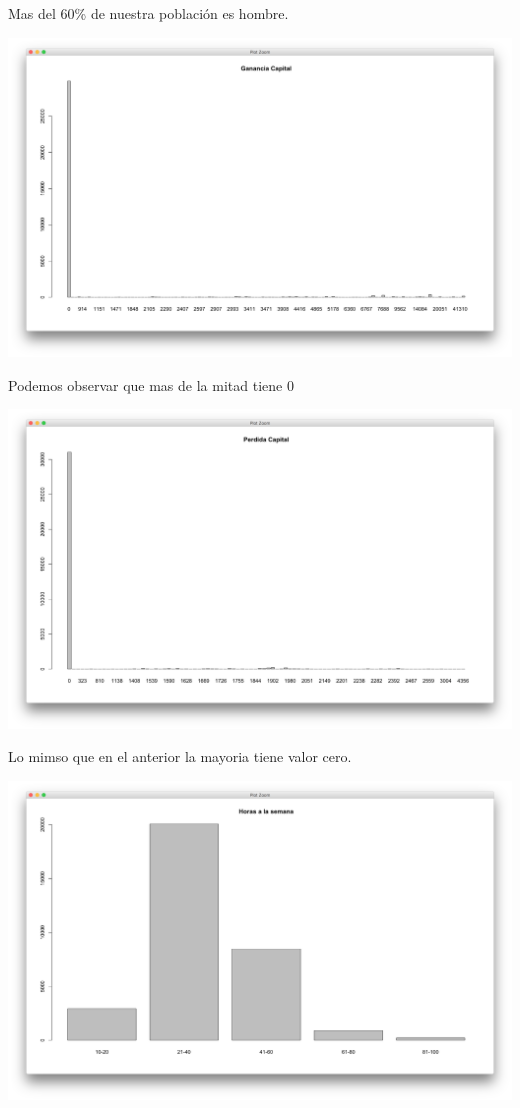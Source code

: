 \documentclass{article}
\begin{document}
  Mas del 60\% de nuestra población es hombre.
  \begin{center}
    \hbox{\hspace{-5.5em}\includegraphics[scale=0.4]{graficas/gananciaCapital}}
  \end{center}
  Podemos observar que mas de la mitad tiene 0
  \begin{center}
    \hbox{\hspace{-5.5em}\includegraphics[scale=0.4]{graficas/perdidaCapital}}
  \end{center}
  Lo mimso que en el anterior la mayoria tiene valor cero.
  \begin{center}
    \hbox{\hspace{-5.5em}\includegraphics[scale=0.4]{graficas/hpwP}}
  \end{center}
\end{document}
